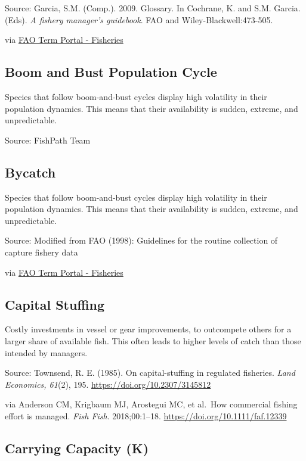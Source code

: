 \documentclass[
  11pt,
]{book}
\begin{document}
Source: Garcia, S.M. (Comp.). 2009. Glossary. In Cochrane, K. and S.M. Garcia. (Eds). \emph{A fishery manager's guidebook}. FAO and Wiley-Blackwell:473-505.

via \href{http://www.fao.org/fishery/glossary/en}{FAO Term Portal - Fisheries}

\hypertarget{boom-and-bust-population-cycle}{%
\subsection{Boom and Bust Population Cycle}\label{boom-and-bust-population-cycle}}

Species that follow boom-and-bust cycles display high volatility in their population dynamics. This means that their availability is sudden, extreme, and unpredictable.

Source: FishPath Team

\hypertarget{bycatch}{%
\subsection{Bycatch}\label{bycatch}}

Species that follow boom-and-bust cycles display high volatility in their population dynamics. This means that their availability is sudden, extreme, and unpredictable.

Source: Modified from FAO (1998): Guidelines for the routine collection of capture fishery data

via \href{http://www.fao.org/fishery/glossary/en}{FAO Term Portal - Fisheries}

\hypertarget{capital-stuffing}{%
\subsection{Capital Stuffing}\label{capital-stuffing}}

Costly investments in vessel or gear improvements, to outcompete others for a larger share of available fish. This often leads to higher levels of catch than those intended by managers.

Source: Townsend, R. E. (1985). On capital-stuffing in regulated fisheries. \emph{Land
Economics, 61}(2), 195. \url{https://doi.org/10.2307/3145812}

via Anderson CM, Krigbaum MJ,
Arostegui MC, et al.~How commercial fishing effort is managed. \emph{Fish Fish}. 2018;00:1--18. \url{https://doi.org/10.1111/faf.12339}

\hypertarget{carrying-capacity-k}{%
\subsection{Carrying Capacity (K)}\label{carrying-capacity-k}}
\end{document}
